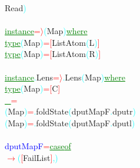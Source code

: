 {\rm{}Read}\textcolor{cyan}{)}\\\\\textcolor{green}{\underline{instance}}\hsspace \textcolor{red}{=\ensuremath{\rangle}}\hsspace \textcolor{cyan}{(}{\rm{}Map}\textcolor{cyan}{)}\hsspace \textcolor{green}{\underline{where}}\\\hstab \textcolor{green}{\underline{type}}\hsspace \textcolor{cyan}{(}{\rm{}Map}\textcolor{cyan}{)}\hsspace \textcolor{red}{=}\hsspace \textcolor{red}{[}{\rm{}ListAtom}\hsspace \textcolor{cyan}{(}{\rm{}L}\textcolor{cyan}{)}\textcolor{red}{]}\\\hstab \textcolor{green}{\underline{type}}\hsspace \textcolor{cyan}{(}{\rm{}Map}\textcolor{cyan}{)}\hsspace \textcolor{red}{=}\hsspace \textcolor{red}{[}{\rm{}ListAtom}\hsspace \textcolor{cyan}{(}{\rm{}R}\textcolor{cyan}{)}\textcolor{red}{]}\\\\\textcolor{green}{\underline{instance}}\textcolor{cyan}{.}{\rm{}Lens}\hsspace \textcolor{red}{=\ensuremath{\rangle}}\textcolor{cyan}{.}{\rm{}Lens}\hsspace \textcolor{cyan}{(}{\rm{}Map}\textcolor{cyan}{)}\hsspace \textcolor{green}{\underline{where}}\\\hstab \textcolor{green}{\underline{type}}\hsspace \textcolor{cyan}{(}{\rm{}Map}\textcolor{cyan}{)}\hsspace \textcolor{red}{=}\hsspace \textcolor{red}{[}{\rm{}C}\textcolor{red}{]}\\\hsspace \textcolor{green}{\underline{\_}}\hsspace \textcolor{red}{=}\hsspace {\rm{}[]}\\\hsspace \textcolor{cyan}{(}{\rm{}Map}\textcolor{cyan}{)}\hsspace \textcolor{red}{=}\textcolor{cyan}{.}{\rm{}foldState}\hsspace \textcolor{cyan}{(}{\rm{}dputMapF}\textcolor{cyan}{.}{\rm{}dputr}\textcolor{cyan}{)}\\\hsspace \textcolor{cyan}{(}{\rm{}Map}\textcolor{cyan}{)}\hsspace \textcolor{red}{=}\textcolor{cyan}{.}{\rm{}foldState}\hsspace \textcolor{cyan}{(}{\rm{}dputMapF}\textcolor{cyan}{.}{\rm{}dputl}\textcolor{cyan}{)}\\\\\textcolor{blue}{dputMapF}\hsspace \textcolor{red}{=}\hsspace \textcolor{green}{\underline{case}}\hsspace \textcolor{green}{\underline{of}}\\\hsspace \hsspace \hsspace \hsspace \textcolor{red}{\ensuremath{\rightarrow}}\hsspace \textcolor{cyan}{(}\textcolor{red}{[}{\rm{}FailList}\textcolor{red}{]}\textcolor{cyan}{,}\textcolor{cyan}{)}\\\hsspace 